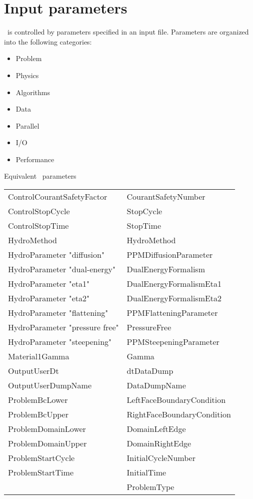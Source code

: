 \documentclass{article}
\begin{document}
\section{Input parameters} \label{s:input}

\cello\ is controlled by parameters specified in an input file.  Parameters
are organized into the following categories:

\begin{itemize}
\item Problem
\item Physics
\item Algorithms
\item Data
\item Parallel
\item I/O
\item Performance
\end{itemize}

Equivalent \enzo\ parameters

\begin{tabular}{ll}
ControlCourantSafetyFactor        & CourantSafetyNumber \\
ControlStopCycle           & StopCycle \\
ControlStopTime            & StopTime \\
HydroMethod                & HydroMethod \\
HydroParameter "diffusion"    & PPMDiffusionParameter \\
HydroParameter "dual-energy"  & DualEnergyFormalism \\
HydroParameter "eta1"    & DualEnergyFormalismEta1 \\
HydroParameter "eta2"    & DualEnergyFormalismEta2 \\
HydroParameter "flattening"   & PPMFlatteningParameter \\
HydroParameter "pressure free" & PressureFree \\
HydroParameter "steepening"  & PPMSteepeningParameter \\
Material1Gamma             & Gamma \\
OutputUserDt               & dtDataDump \\
OutputUserDumpName         & DataDumpName \\
ProblemBcLower             & LeftFaceBoundaryCondition \\
ProblemBcUpper             & RightFaceBoundaryCondition \\
ProblemDomainLower         & DomainLeftEdge \\
ProblemDomainUpper         & DomainRightEdge \\
ProblemStartCycle          & InitialCycleNumber \\
ProblemStartTime           & InitialTime \\
                           & ProblemType \\
\end{tabular}
\end{document}
